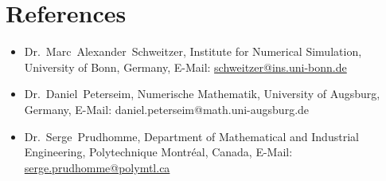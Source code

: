 \documentclass[11pt,a4paper,sans]{moderncv}
\begin{document}
\section{References}
\begin{itemize}[leftmargin=4cm]
\item Dr.~Marc~Alexander~Schweitzer, Institute for Numerical Simulation, University of Bonn, Germany, E-Mail: \url{schweitzer@ins.uni-bonn.de}
\item Dr.~Daniel~Peterseim, Numerische Mathematik, University of Augsburg, Germany, E-Mail: daniel.peterseim@math.uni-augsburg.de
\end{itemize}
\begin{itemize}[leftmargin=4cm]
\item Dr.~Serge~Prudhomme, Department of Mathematical and Industrial Engineering, Polytechnique Montr\'eal, Canada, E-Mail: \url{serge.prudhomme@polymtl.ca}
\end{itemize}
\end{document}
